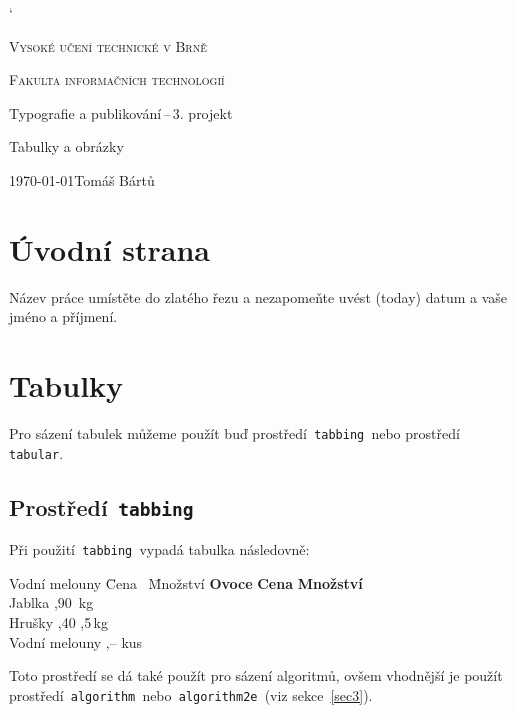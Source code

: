 \documentclass[a4paper,11pt]{article}[20-03-2022]
\begin{document}
\catcode`
\begin{titlepage}
    \begin{center}
        \Huge \textsc{Vysoké učení technické v Brně}

        \huge \textsc{Fakulta informačních technologií}

        
        \LARGE Typografie a publikování\,--\,3. projekt

        \Huge Tabulky a obrázky

    \end{center}
    \Large \today \hfill Tomáš Bártů
\end{titlepage}

\section{Úvodní strana}
Název práce umístěte do zlatého řezu a nezapomeňte uvést  (today) datum a vaše jméno a příjmení.

\section{Tabulky}
Pro sázení tabulek můžeme použít buď prostředí\texttt{ tabbing }nebo prostředí\texttt{ tabular}.

\subsection{Prostředí\texttt{ tabbing }}
Při použití\texttt{ tabbing }vypadá tabulka následovně:
\begin{tabbing}
    Vodní melouny \quad \= Cena \quad\  \= Množství \kill
    \textbf{Ovoce}      \> \textbf{Cena} \> \textbf{Množství}\\
    Jablka              ,90         \,kg\\
    Hrušky              ,40         ,5\,kg\\
    Vodní melouny       ,--          kus\\
\end{tabbing}
Toto prostředí se dá také použít pro sázení algoritmů, ovšem vhodnější je použít prostředí\texttt{ algorithm }nebo\texttt{ algorithm2e }(viz sekce~\ref{sec3}).
\end{document}
